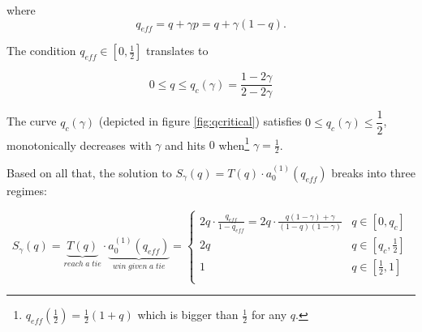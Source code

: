 \documentclass[letterpaper,12pt]{report}
\begin{document}
where 
\begin{equation}\label{qeff}
q_{eff}=q+\gamma p=q+\gamma(1-q).
\end{equation}

The condition $q_{eff}\in [0,\frac{1}{2}]$ translates to 

\begin{equation}\label{qcrit}
0\leq q\leq q_{c}(\gamma)=\dfrac{1-2\gamma}{2-2\gamma}
\end{equation}

The curve $q_c(\gamma)$ (depicted in figure \ref{fig:qcritical}) satisfies $0 \leq   q_{c}(\gamma) \leq\dfrac{1}{2}$, monotonically decreases with $\gamma$ and hits $0$ when\footnote{$q_{eff}(\frac{1}{2})=\frac{1}{2}(1+q)$ which is bigger than $\frac{1}{2}$ for any $q$.} $\gamma=\frac{1}{2}$.

Based on all that, the solution to $S_\gamma(q)=T(q)\cdot a_0^{(1)}(q_{eff})$ breaks into three regimes:

\begin{equation}\label{eq:sofq}
S_\gamma(q)=\underbrace{T(q)}_{reach\; a\; tie}\cdot \underbrace{a_0^{(1)}(q_{eff})}_{win\;given\;a\;tie}=
\begin{cases}
2q\cdot\frac{q_{eff}}{1-q_{eff}}=2q\cdot\frac{q(1-\gamma)+\gamma}{(1-q)(1-\gamma)} & q\in [0,q_c] \\ 
2q & q\in [q_c,\frac{1}{2}] \\ 
1 & q\in [\frac{1}{2},1] \\ 
\end{cases}
\end{equation}

\noindent%
\begin{minipage}{\linewidth}
\label{fig:qcritical}
\end{minipage}
\linebreak
\end{document}
